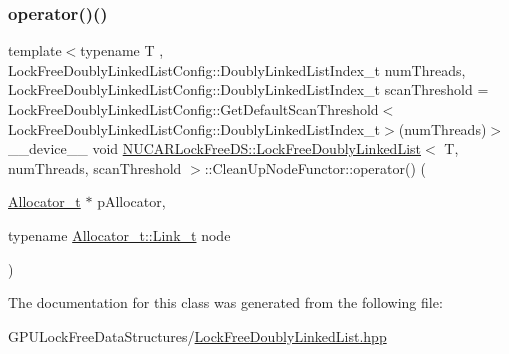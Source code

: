 \subsubsection{\texorpdfstring{operator()()}{operator()()}}
{\footnotesize\ttfamily template$<$typename T , Lock\+Free\+Doubly\+Linked\+List\+Config\+::\+Doubly\+Linked\+List\+Index\+\_\+t num\+Threads, Lock\+Free\+Doubly\+Linked\+List\+Config\+::\+Doubly\+Linked\+List\+Index\+\_\+t scan\+Threshold = Lock\+Free\+Doubly\+Linked\+List\+Config\+::\+Get\+Default\+Scan\+Threshold$<$\+Lock\+Free\+Doubly\+Linked\+List\+Config\+::\+Doubly\+Linked\+List\+Index\+\_\+t$>$(num\+Threads)$>$ \\
\+\_\+\+\_\+device\+\_\+\+\_\+ void \mbox{\hyperlink{class_n_u_c_a_r_lock_free_d_s_1_1_lock_free_doubly_linked_list}{N\+U\+C\+A\+R\+Lock\+Free\+D\+S\+::\+Lock\+Free\+Doubly\+Linked\+List}}$<$ T, num\+Threads, scan\+Threshold $>$\+::Clean\+Up\+Node\+Functor\+::operator() (\begin{DoxyParamCaption}\item[{\mbox{\hyperlink{class_n_u_c_a_r_lock_free_d_s_1_1_lock_free_doubly_linked_list_af534991f4eb0641191f936a80c701e6c}{Allocator\+\_\+t}} $\ast$}]{p\+Allocator,  }\item[{typename \mbox{\hyperlink{class_n_u_c_a_r_lock_free_d_s_1_1_allocator_a5508d82b795e6c1977bebb67b5e5b686}{Allocator\+\_\+t\+::\+Link\+\_\+t}}}]{node }\end{DoxyParamCaption})\hspace{0.3cm}{\ttfamily [inline]}}



The documentation for this class was generated from the following file\+:\begin{DoxyCompactItemize}
\item 
G\+P\+U\+Lock\+Free\+Data\+Structures/\mbox{\hyperlink{_lock_free_doubly_linked_list_8hpp}{Lock\+Free\+Doubly\+Linked\+List.\+hpp}}\end{DoxyCompactItemize}
